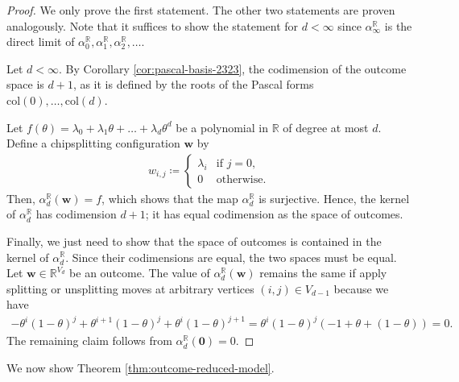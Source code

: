 \begin{proof}
    We only prove the first statement. The other two statements are proven analogously. Note that it suffices to show the statement for \( d < \infty \) since \( \alpha_\infty^\mathbb{R} \) is the direct limit of \( \alpha^{\mathbb R}_0, \alpha^{\mathbb R}_1, \alpha^{\mathbb R}_2, \dots \).

    Let \( d < \infty \). By Corollary \ref{cor:pascal-basis-2323}, the codimension of the outcome space is \( d+1 \), as it is defined by the roots of the Pascal forms \( \mathrm{col}(0), \dots, \mathrm{col}(d) \). 

    Let \( f(\theta) = \lambda_0 + \lambda_1 \theta + \dots + \lambda_d \theta^d  \) be a polynomial in \( \mathbb R \) of degree at most \( d \). Define a chipsplitting configuration \( \mathbf{w} \) by 
        \begin{align*}
            w_{i,j} \coloneqq \begin{cases}
                \lambda_i & \text{if } j=0, \\
                0 & \text{otherwise}.
            \end{cases}
        \end{align*}
    Then, \( \alpha^\mathbb{R}_d(\mathbf w) = f \), which shows that the map \( \alpha^{\mathbb R}_d \) is surjective. Hence, the kernel of \( \alpha^{\mathbb R}_d \) has codimension \( d+1 \); it has equal codimension as the space of outcomes. 

    Finally, we just need to show that the space of outcomes is contained in the kernel of \( \alpha^{\mathbb R}_d \). Since their codimensions are equal, the two spaces must be equal. Let \( \mathbf{w} \in \mathbb{R}^{V_d} \) be an outcome. The value of \( \alpha^{\mathbb R}_d(\mathbf w) \) remains the same if apply splitting or unsplitting moves at arbitrary vertices \( (i,j) \in V_{d-1} \) because we have 
    \begin{align*}
        -\theta^i(1-\theta)^j + \theta^{i+1}(1-\theta)^j + \theta^i(1-\theta)^{j+1} = \theta^i(1-\theta)^j (-1 + \theta + (1 - \theta)) = 0.
    \end{align*}
    The remaining claim follows from \( \alpha_d^{\mathbb{R}}(\mathbf 0) = 0 \).
\end{proof}

We now show Theorem \ref{thm:outcome-reduced-model}.

